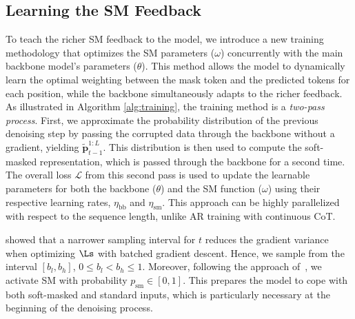 \documentclass{article}
\begin{document}
\subsection{Learning the SM Feedback}

To teach the richer SM feedback to the model, we introduce a new training methodology that optimizes the SM parameters ($\omega$) concurrently with the main backbone model's parameters ($\theta$). 
%
This method allows the model to dynamically learn the optimal weighting between the mask token and the predicted tokens for each position, while the backbone simultaneously adapts to the richer feedback. 
%
As illustrated in Algorithm \ref{alg:training}, the training method is a \emph{two-pass process}. 
%
First, we approximate the probability distribution of the previous denoising step by passing the corrupted data through the backbone without a gradient, yielding $\mathbf{\tilde{p}}^{1:L}_{t-1}$. 
%
This distribution is then used to compute the soft-masked representation, which is passed through the backbone for a second time. 
%
The overall loss $\mathcal{L}$ from this second pass is used to update the learnable parameters for both the backbone ($\theta$) and the SM function ($\omega$) using their respective learning rates, $\eta_{\text{bb}}$ and $\eta_{\text{sm}}$. 
%
This approach can be highly parallelized with respect to the sequence length, unlike AR training with continuous CoT. 

\citet{arriola_block_2024} showed that a narrower sampling interval for $t$ reduces the gradient variance when optimizing $\Ls$ with batched gradient descent. 
% 
Hence, we sample from the interval $[b_l, b_h]$, $0 \leq b_l < b_h \leq 1$. 
%
Moreover, following the approach of~\citet{chen_analog_2023}, we activate SM with probability $p_{\text{sm}}\in[0,1]$. 
%
This prepares the model to cope with both soft-masked and standard inputs, which is particularly necessary at the beginning of the denoising process. 
%
\end{document}
